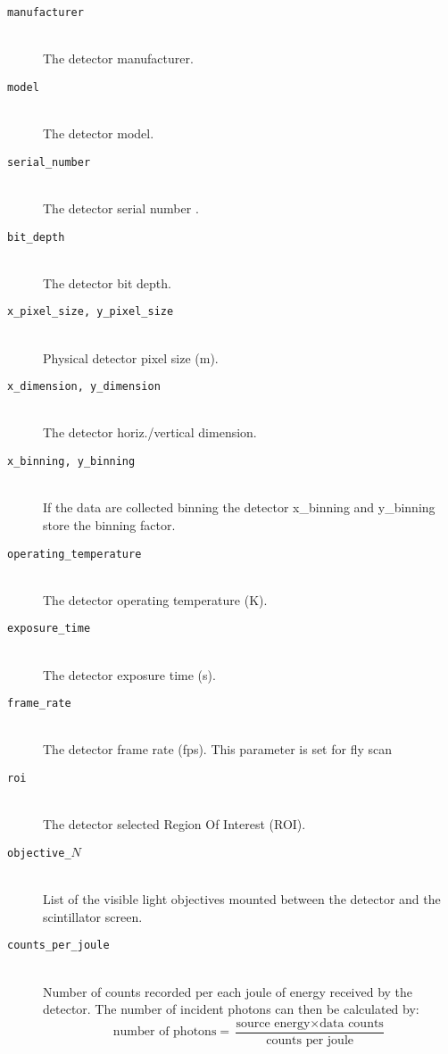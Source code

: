 \begin{description}
\item[\tt{manufacturer}] \hfill \\
{The detector manufacturer.}

\item[\tt{model}] \hfill \\
{The detector model.}

\item[\tt{serial\_number}] \hfill \\
{The detector serial number .}
     
\item[\tt{bit\_depth}] \hfill \\
{The detector bit depth.}

\item[\tt{x\_pixel\_size, y\_pixel\_size}] \hfill \\
{Physical detector pixel size (m).}

\item[\tt{x\_dimension, y\_dimension}] \hfill \\
{The detector horiz./vertical dimension.}

\item[\tt{x\_binning, y\_binning}] \hfill \\
{If the data are collected binning the detector x\_binning and y\_binning store the binning factor.}

\item[\tt{operating\_temperature}] \hfill \\
{The detector operating temperature (K).}

\item[\tt{exposure\_time}] \hfill \\
{The detector exposure time (s).}

\item[\tt{frame\_rate}] \hfill \\
{The detector frame rate (fps). This parameter is set for fly scan}

\item[\tt{roi}] \hfill \\
{The detector selected Region Of Interest (ROI).}

\item[\tt{objective\_$N$}] \hfill \\
{List of the visible light objectives mounted between the detector and the scintillator screen.}

\item[\tt{counts\_per\_joule}] \hfill \\
{Number of counts recorded per each joule of energy received by the detector. The number of incident photons can then be calculated by:
\begin{equation*}
\text{number of photons} = \frac{\text{source energy} \times \text{data counts}}{\text{counts per joule}}
\end{equation*}
}


\end{description}

